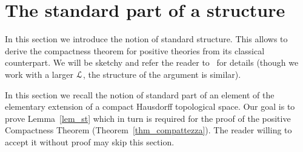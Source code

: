 \documentclass{amsproc}
\begin{document}
\begin{comment}
  \ceq{\hfill M\models\varphi(a)}{\Leftrightarrow}{N\models\varphi(fa)}

  for every $a\in({\rm dom }f)^{|x|}$ and every formula $\varphi(x)\in{\EuScript F}^{\rm p}$ without quantifiers of sort ${\sf H}$.
\end{fact}

\begin{proof}
  The equivalence is trivial for formulas in ${\EuScript L}_{\sf H}$ so we only consider atomic formulas of the form $t\in C$.
  Implication $\Rightarrow$ holds by definition. 
  Vice versa, if $M\models \tau(a)\notin C$ then, by normality,  $M\models \tau(a)\in\tilde{C}$ for some compact $\tilde C$ disjoint of $C$.
  By the definition of partial embedding, $N\models \tau(a)\in\tilde{C}$.
  Hence $N\models \tau(a)\notin C$.
  Induction is immediate.
\end{proof}
  
\end{comment}



\section{The standard part of a structure}\label{standard_part}

\def\ceq#1#2#3{\parbox[t]{18ex}{$\displaystyle #1$}\parbox[t]{6ex}{\hfil $#2$}{$\displaystyle #3$}}

In this section we introduce the notion of standard structure.
This allows to derive the compactness theorem for positive theories from its classical counterpart.
We will be sketchy and refer the reader to~\cite{clcl} for details (though we work with a larger ${\EuScript L}$, the structure of the argument is similar).

In this section we recall the notion of standard part of an element of the elementary extension of a compact Hausdorff topological space.
Our goal is to prove Lemma~\ref{lem_st} which in turn is required for the proof of the positive Compactness Theorem (Theorem~\ref{thm_compattezza}).
The reader willing to accept it without proof may skip this section.
\end{document}

